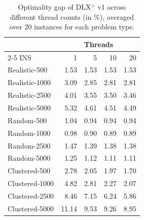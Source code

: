 \begin{table}[ht]
\centering
\caption{Optimality gap of DLX$^+$ v1 across different thread counts (in \%), averaged over 20 instances for each problem type.}
\label{tab:dlx_parallelisation}
\begin{tabular}{lrrrr}
\toprule
& \multicolumn{4}{c}{Threads} \\
\cmidrule(lr){2-5}
INS & 1 & 5 & 10 & 20 \\
\midrule
Realistic-500 & 1.53 & 1.53 & 1.53 & 1.53 \\
Realistic-1000 & 3.09 & 2.85 & 2.81 & 2.81 \\
Realistic-2500 & 4.01 & 3.55 & 3.50 & 3.46 \\
Realistic-5000 & 5.32 & 4.61 & 4.51 & 4.49 \\
\midrule
Random-500 & 1.04 & 0.94 & 0.94 & 0.94 \\
Random-1000 & 0.98 & 0.90 & 0.89 & 0.89 \\
Random-2500 & 1.47 & 1.39 & 1.38 & 1.38 \\
Random-5000 & 1.25 & 1.12 & 1.11 & 1.11 \\
\midrule
Clustered-500 & 2.78 & 2.05 & 1.97 & 1.70 \\
Clustered-1000 & 4.82 & 2.81 & 2.27 & 2.07 \\
Clustered-2500 & 8.46 & 7.15 & 6.24 & 5.86 \\
Clustered-5000 & 11.14 & 9.53 & 9.26 & 8.95 \\
\bottomrule
\end{tabular}
\end{table}